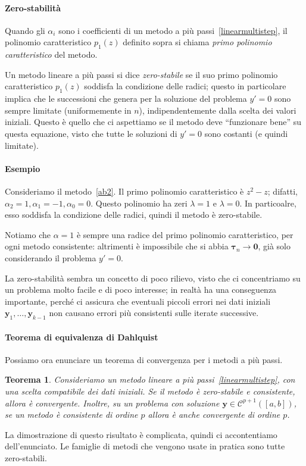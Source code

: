 \documentclass[a4paper]{report}
\newtheorem{theorem}{Teorema}[chapter]
\theoremstyle{definiton}
\theoremstyle{remark}
\newcommand{\y}{\mathbf{y}}
\begin{document}
\paragraph{Zero-stabilità}
Quando gli $\alpha_i$ sono i coefficienti di un metodo a più passi~\eqref{linearmultistep}, il polinomio caratteristico $p_1(z)$ definito sopra si chiama \emph{primo polinomio caratteristico} del metodo.

Un metodo lineare a più passi si dice \emph{zero-stabile} se il suo primo polinomio caratteristico $p_1(z)$ soddisfa la condizione delle radici; questo in particolare implica che le successioni che genera per la soluzione del problema $y'=0$ sono sempre limitate (uniformemente in $n$), indipendentemente dalla scelta dei valori iniziali. Questo è quello che ci aspettiamo se il metodo deve ``funzionare bene'' su questa equazione, visto che tutte le soluzioni di $y'=0$ sono costanti (e quindi limitate).

\paragraph{Esempio} Consideriamo il metodo~\eqref{ab2}. Il primo polinomio caratteristico è $z^2-z$; difatti, $\alpha_2=1, \alpha_1=-1, \alpha_0 = 0$. Questo polinomio ha zeri $\lambda=1$ e $\lambda=0$. In particoalre, esso soddisfa la condizione delle radici, quindi il metodo è zero-stabile.

Notiamo che $\alpha = 1$ è sempre una radice del primo polinomio caratteristico, per ogni metodo consistente: altrimenti è impossibile che si abbia $\boldsymbol{\tau}_n \to \mathbf{0}$, già solo considerando il problema $y'=0$.

La zero-stabilità sembra un concetto di poco rilievo, visto che ci concentriamo su un problema molto facile e di poco interesse; in realtà ha una conseguenza importante, perché ci assicura che eventuali piccoli errori nei dati iniziali $\y_1,\dots,\y_{k-1}$ non causano errori più consistenti sulle iterate successive.

\paragraph{Teorema di equivalenza di Dahlquist}
Possiamo ora enunciare un teorema di convergenza per i metodi a più passi.
\begin{theorem}
Consideriamo un metodo lineare a più passi~\eqref{linearmultistep}, con una scelta compatibile dei dati iniziali. Se il metodo è zero-stabile e consistente, allora è convergente. Inoltre, su un problema con soluzione $\y \in \mathcal{C}^{p+1}([a,b])$, se un metodo è consistente di ordine $p$ allora è anche convergente di ordine $p$.
\end{theorem}
La dimostrazione di questo risultato è complicata, quindi ci accontentiamo dell'enunciato. Le famiglie di metodi che vengono usate in pratica sono tutte zero-stabili.
\end{document}
